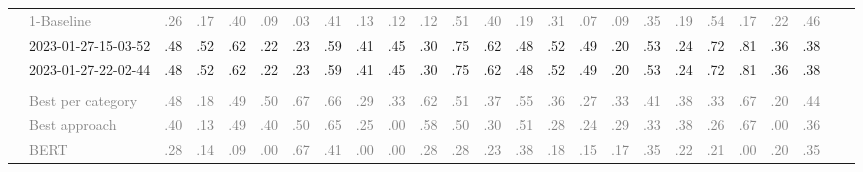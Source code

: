 \begin{table*}
\begin{tabular}{@{}ll@{\hspace{10pt}}c@{\hspace{5pt}}cccccccccccccccccccccc@{}}
& \textcolor{gray}{1-Baseline} & \textcolor{gray}{.26} & \textcolor{gray}{.17} & \textcolor{gray}{.40} & \textcolor{gray}{.09} & \textcolor{gray}{.03} & \textcolor{gray}{.41} & \textcolor{gray}{.13} & \textcolor{gray}{.12} & \textcolor{gray}{.12} & \textcolor{gray}{.51} & \textcolor{gray}{.40} & \textcolor{gray}{.19} & \textcolor{gray}{.31} & \textcolor{gray}{.07} & \textcolor{gray}{.09} & \textcolor{gray}{.35} & \textcolor{gray}{.19} & \textcolor{gray}{.54} & \textcolor{gray}{.17} & \textcolor{gray}{.22} & \textcolor{gray}{.46} \\
& 2023-01-27-15-03-52 & .48 & .52 & .62 & .22 & .23 & .59 & .41 & .45 & .30 & .75 & .62 & .48 & .52 & .49 & .20 & .53 & .24 & .72 & .81 & .36 & .38 \\
& 2023-01-27-22-02-44 & .48 & .52 & .62 & .22 & .23 & .59 & .41 & .45 & .30 & .75 & .62 & .48 & .52 & .49 & .20 & .53 & .24 & .72 & .81 & .36 & .38 \\
\addlinespace
\multicolumn{2}{@{}l}{\emph{Nahj al-Balagha}} \\
& \textcolor{gray}{Best per category} & \textcolor{gray}{.48} & \textcolor{gray}{.18} & \textcolor{gray}{.49} & \textcolor{gray}{.50} & \textcolor{gray}{.67} & \textcolor{gray}{.66} & \textcolor{gray}{.29} & \textcolor{gray}{.33} & \textcolor{gray}{.62} & \textcolor{gray}{.51} & \textcolor{gray}{.37} & \textcolor{gray}{.55} & \textcolor{gray}{.36} & \textcolor{gray}{.27} & \textcolor{gray}{.33} & \textcolor{gray}{.41} & \textcolor{gray}{.38} & \textcolor{gray}{.33} & \textcolor{gray}{.67} & \textcolor{gray}{.20} & \textcolor{gray}{.44} \\
& \textcolor{gray}{Best approach} & \textcolor{gray}{.40} & \textcolor{gray}{.13} & \textcolor{gray}{.49} & \textcolor{gray}{.40} & \textcolor{gray}{.50} & \textcolor{gray}{.65} & \textcolor{gray}{.25} & \textcolor{gray}{.00} & \textcolor{gray}{.58} & \textcolor{gray}{.50} & \textcolor{gray}{.30} & \textcolor{gray}{.51} & \textcolor{gray}{.28} & \textcolor{gray}{.24} & \textcolor{gray}{.29} & \textcolor{gray}{.33} & \textcolor{gray}{.38} & \textcolor{gray}{.26} & \textcolor{gray}{.67} & \textcolor{gray}{.00} & \textcolor{gray}{.36} \\
& \textcolor{gray}{BERT} & \textcolor{gray}{.28} & \textcolor{gray}{.14} & \textcolor{gray}{.09} & \textcolor{gray}{.00} & \textcolor{gray}{.67} & \textcolor{gray}{.41} & \textcolor{gray}{.00} & \textcolor{gray}{.00} & \textcolor{gray}{.28} & \textcolor{gray}{.28} & \textcolor{gray}{.23} & \textcolor{gray}{.38} & \textcolor{gray}{.18} & \textcolor{gray}{.15} & \textcolor{gray}{.17} & \textcolor{gray}{.35} & \textcolor{gray}{.22} & \textcolor{gray}{.21} & \textcolor{gray}{.00} & \textcolor{gray}{.20} & \textcolor{gray}{.35} \\

\end{tabular}
\end{table*}
